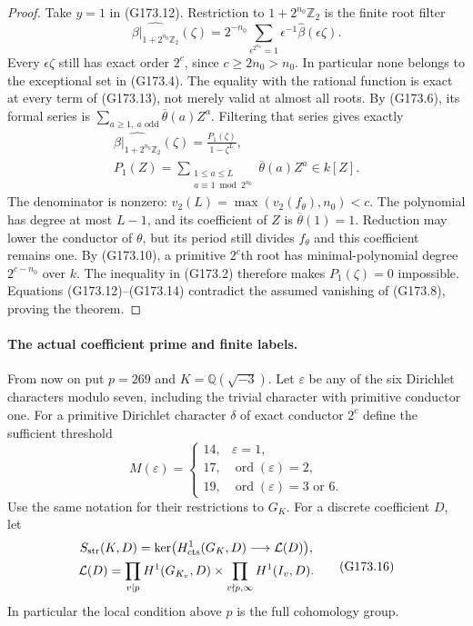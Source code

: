 \begin{proof}
Take $y=1$ in (G173.12).  Restriction to
$1+2^{n_0}\mathbb Z_2$ is the finite root filter
\[
 \widehat{\beta|_{1+2^{n_0}\mathbb Z_2}}(\zeta)
 =2^{-n_0}\sum_{\epsilon^{2^{n_0}}=1}
                         \epsilon^{-1}\widehat\beta(\epsilon\zeta).
 \tag{G173.13}
\]
Every $\epsilon\zeta$ still has exact order $2^c$, since
$c\geq2n_0>n_0$.  In particular none belongs to the exceptional
set in (G173.4).  The equality with the rational function is exact
at every term of (G173.13), not merely valid at almost all roots.
By (G173.6), its formal series is
$\sum_{a\geq1,\ a\text{ odd}}\overline\theta(a)Z^a$.
Filtering that series gives exactly
\[
 \begin{gathered}
 \widehat{\beta|_{1+2^{n_0}\mathbb Z_2}}(\zeta)
              =\frac{P_1(\zeta)}{1-\zeta^L},\\
 P_1(Z)=\sum_{\substack{1\leq a\leq L\\a\equiv1\bmod2^{n_0}}}
                              \overline\theta(a)Z^a\in k[Z].
 \end{gathered}
 \tag{G173.14}
\]
The denominator is nonzero: $v_2(L)=\max(v_2(f_\theta),n_0)<c$.
The polynomial has degree at most $L-1$, and its coefficient of
$Z$ is $\overline\theta(1)=1$.  Reduction may lower the conductor
of $\theta$, but its period still divides $f_\theta$ and this
coefficient remains one.
By (G173.10), a primitive $2^c$th root has minimal-polynomial degree
$2^{c-n_0}$ over $k$.  The inequality in (G173.2) therefore makes
$P_1(\zeta)=0$ impossible.  Equations (G173.12)--(G173.14) contradict
the assumed vanishing of (G173.8), proving the theorem.
\end{proof}

\paragraph{The actual coefficient prime and finite labels.}
From now on put $p=269$ and $K=\mathbb Q(\sqrt{-3})$.
Let $\varepsilon$ be any of the six Dirichlet characters modulo seven,
including the trivial character with primitive conductor one.
For a primitive Dirichlet character $\delta$ of exact conductor $2^c$
define the sufficient threshold
\[
 M(\varepsilon)=
 \begin{cases}
 14,&\varepsilon=1,\\
 17,&\operatorname{ord}(\varepsilon)=2,\\
 19,&\operatorname{ord}(\varepsilon)=3\text{ or }6.
 \end{cases}
 \tag{G173.15}
\]
Use the same notation for their restrictions to $G_K$.
For a discrete coefficient $D$, let
\[
 \begin{gathered}
 S_{\rm str}(K,D)=\ker\bigl(H^1_{\rm cts}(G_K,D)
                                      \longrightarrow\mathcal L(D)\bigr),\\
 \mathcal L(D)=\prod_{v\mid p}H^1(G_{K_v},D)
                         \times\prod_{v\nmid p,\infty}H^1(I_v,D).
 \end{gathered}
 \tag{G173.16}
\]
In particular the local condition above $p$ is the full cohomology group.

